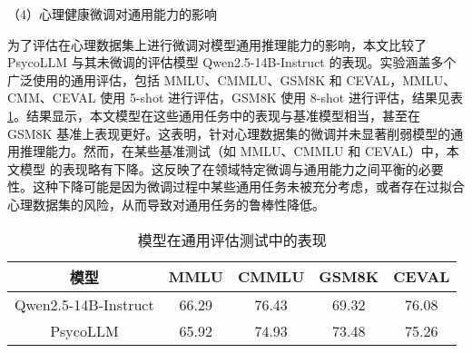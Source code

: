 \begin{table}[h]
    \centering
    \caption{不同模型在二级和三级心理咨询师考试中的表现}
\end{table}

（4）心理健康微调对通用能力的影响

为了评估在心理数据集上进行微调对模型通用推理能力的影响，本文比较了 PsycoLLM 与其未微调的评估模型 Qwen2.5-14B-Instruct 的表现。实验涵盖多个广泛使用的通用评估，包括 MMLU、CMMLU、GSM8K 和 CEVAL，MMLU、CMM、CEVAL 使用 5-shot 进行评估，GSM8K 使用 8-shot 进行评估，结果见表 \ref{tab:work1-模型在通用评估测试中的表现}。结果显示，本文模型在这些通用任务中的表现与基准模型相当，甚至在 GSM8K 基准上表现更好。这表明，针对心理数据集的微调并未显著削弱模型的通用推理能力。然而，在某些基准测试（如 MMLU、CMMLU 和 CEVAL）中，本文模型 的表现略有下降。这反映了在领域特定微调与通用能力之间平衡的必要性。这种下降可能是因为微调过程中某些通用任务未被充分考虑，或者存在过拟合心理数据集的风险，从而导致对通用任务的鲁棒性降低。

\begin{table}
  \centering
  \caption{模型在通用评估测试中的表现}
  \label{tab:work1-模型在通用评估测试中的表现}
  \begin{tabular}{ccccc}
    \toprule
    模型 & MMLU & CMMLU & GSM8K & CEVAL \\
    \midrule
    Qwen2.5-14B-Instruct & 66.29 & 76.43 & 69.32 & 76.08 \\
    PsycoLLM & 65.92 & 74.93 & 73.48 & 75.26 \\
    \bottomrule
  \end{tabular}
\end{table}

